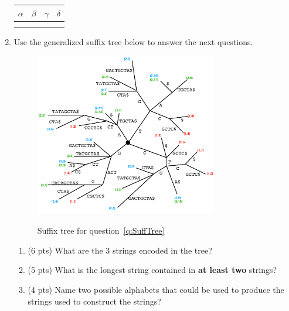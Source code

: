 \documentclass[11pt, oneside]{article}   	%
\begin{document}
\begin{enumerate}
\begin{center}
\begin{tabular}{|c|c|c|c|}
\multicolumn{1}{c}{$\alpha$} & \multicolumn{1}{c}{$\beta$} & \multicolumn{1}{c}{$\gamma$} & \multicolumn{1}{c}{$\delta$}\\
\hline
\hspace{5em} & \hspace{5em} & \hspace{5em} & \hspace{5em} \\
\hspace{5em} & \hspace{5em} & \hspace{5em} & \hspace{5em} \\
\hline
\end{tabular}
\end{center}

\clearpage
\item Use the generalized suffix tree below to answer the next questions. 
\label{q:SuffTree}

\begin{figure}[h!]
\centering
\includegraphics[width=0.75\textwidth]{GST}
\label{f:SuffTree}
\caption{Suffix tree for question~\ref{q:SuffTree}}
\end{figure}

\begin{enumerate}
\item (6 pts) What are the 3 strings encoded in the tree?
\item (5 pts) What is the longest string contained in  \textbf{at least two} strings? 
\item (4 pts) Name two possible alphabets that could be used to produce the strings used to construct the strings? 
\end{enumerate}


\end{enumerate}
\end{document}
